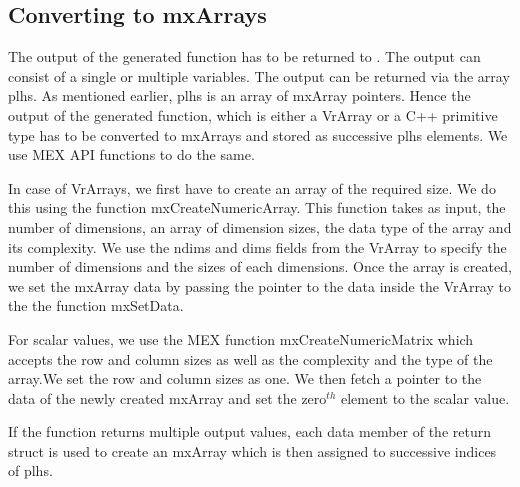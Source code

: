 \subsection{Converting to mxArrays}
The output of the generated function has to be returned to \matlab. The output can consist of a single or multiple variables. The output can be returned via the array plhs. As mentioned earlier, plhs is an array of mxArray pointers. Hence the output of the generated function, which is either a VrArray or a C++ primitive type has to be converted to mxArrays and stored as successive plhs elements. We use MEX API functions to do the same. 

In case of VrArrays, we first have to create an array of the required size. We do this using the function mxCreateNumericArray. This function takes as input, the number of dimensions, an array of dimension sizes, the data type of the array and its complexity. We use the ndims and dims fields from the VrArray to specify the number of dimensions and the sizes of each dimensions. Once the array is created, we set the mxArray data by passing the pointer to the data inside the VrArray to the the function mxSetData.

For scalar values, we use the MEX function mxCreateNumericMatrix which accepts the row and column sizes as well as the complexity and  the type of the array.We set the row and column sizes as one. We then fetch a pointer to the data of the newly created mxArray and set the zero$^{th}$ element to the scalar value. 

If the function returns multiple output values, each data member of the return struct is used to create an mxArray which is then assigned to successive indices of plhs. 
